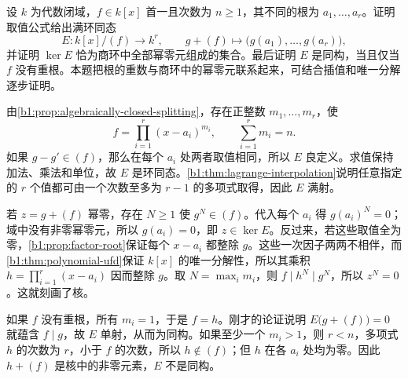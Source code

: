 \begin{exercise}\label{b1:ex:12-closed-field-evaluation}
	设 \(k\) 为代数闭域，\(f\in k[x]\) 首一且次数为 \(n\ge1\)，其不同的根为 \(a_1,\ldots,a_r\)。证明取值公式给出满环同态
	\[
		E:k[x]/(f)\longrightarrow k^r,\qquad g+(f)\longmapsto\bigl(g(a_1),\ldots,g(a_r)\bigr),
	\]
	并证明 \(\ker E\) 恰为商环中全部幂零元组成的集合。最后证明 \(E\) 是同构，当且仅当 \(f\) 没有重根。本题把根的重数与商环中的幂零元联系起来，可结合插值和唯一分解逐步证明。
\end{exercise}
\begin{solution}
	由\cref{b1:prop:algebraically-closed-splitting}，存在正整数 \(m_1,\ldots,m_r\)，使
	\[
		f=\prod_{i=1}^r(x-a_i)^{m_i},\qquad \sum_{i=1}^r m_i=n.
	\]
	如果 \(g-g'\in(f)\)，那么在每个 \(a_i\) 处两者取值相同，所以 \(E\) 良定义。求值保持加法、乘法和单位，故 \(E\) 是环同态。\cref{b1:thm:lagrange-interpolation}说明任意指定的 \(r\) 个值都可由一个次数至多为 \(r-1\) 的多项式取得，因此 \(E\) 满射。

	若 \(z=g+(f)\) 幂零，存在 \(N\ge1\) 使 \(g^N\in(f)\)。代入每个 \(a_i\) 得 \(g(a_i)^N=0\)；域中没有非零幂零元，所以 \(g(a_i)=0\)，即 \(z\in\ker E\)。反过来，若这些取值全为零，\cref{b1:prop:factor-root}保证每个 \(x-a_i\) 都整除 \(g\)。这些一次因子两两不相伴，而\cref{b1:thm:polynomial-ufd}保证 \(k[x]\) 的唯一分解性，所以其乘积 \(h=\prod_{i=1}^r(x-a_i)\) 因而整除 \(g\)。取 \(N=\max_i m_i\)，则 \(f\mid h^N\mid g^N\)，所以 \(z^N=0\)。这就刻画了核。

	如果 \(f\) 没有重根，所有 \(m_i=1\)，于是 \(f=h\)。刚才的论证说明 \(E\bigl(g+(f)\bigr)=0\) 就蕴含 \(f\mid g\)，故 \(E\) 单射，从而为同构。如果至少一个 \(m_i>1\)，则 \(r<n\)，多项式 \(h\) 的次数为 \(r\)，小于 \(f\) 的次数，所以 \(h\notin(f)\)；但 \(h\) 在各 \(a_i\) 处均为零。因此 \(h+(f)\) 是核中的非零元素，\(E\) 不是同构。
\end{solution}
